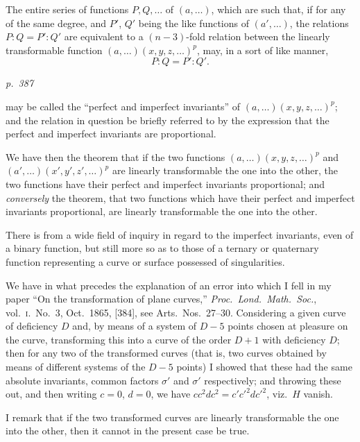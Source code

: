 \documentclass[11pt,a4paper]{book}
\begin{document}
The entire series of functions $P, Q, \ldots$ of $(a, \ldots)$, which are such that, if  for
any of the same degree, and $P'$, $Q'$ being the like functions of $(a', \ldots)$, the relations
$P : Q = P' : Q'$ are equivalent to a $(n-3)$-fold relation between the
linearly transformable function $(a, \ldots)(x, y, z, \ldots)^p$, may, in a sort of like manner,
\[
P : Q = P' : Q'.
\]

\clearpage

\bigskip
\textit{p.~387}
\smallskip

\noindent
may be called the ``perfect and imperfect invariants'' of $(a, \ldots)(x, y, z, \ldots)^p$; and the
relation in question be briefly referred to by the expression that the perfect and
imperfect invariants are proportional.

We have then the theorem that if the two functions $(a, \ldots)(x, y, z, \ldots)^p$ and
$(a', \ldots)(x', y', z', \ldots)^p$ are linearly transformable the one into the other, the two functions
have their perfect and imperfect invariants proportional; and \textit{conversely} the theorem,
that two functions which have their perfect and imperfect invariants proportional, are
linearly transformable the one into the other.

There is from a wide field of inquiry in regard to the imperfect invariants, even
of a binary function, but still more so as to those of a ternary or quaternary function
representing a curve or surface possessed of singularities.

We have in what precedes the explanation of an error into which I fell in my
paper ``On the transformation of plane curves,'' \textit{Proc.\ Lond.\ Math.\ Soc.}, vol.\ \textsc{i}.\ No.~3,
Oct.\ 1865, [384], see Arts.\ Nos.\ 27--30.  Considering a given curve of deficiency $D$ and,
by means of a system of $D - 5$ points chosen at pleasure on the curve, transforming this
into a curve of the order $D + 1$ with deficiency $D$; then for any two of the transformed
curves (that is, two curves obtained by means of different systems of the $D - 5$ points)
I showed that these had the same absolute invariants, common factors $\sigma'$ and $\sigma'$ respectively;
and throwing these out, and then writing $c = 0$, $d = 0$, we have $c c^2 d c^2 = c'c'^2 d c'^2$, viz.\ $H$ vanish.

I remark that if the two transformed curves are linearly transformable the one
into the other, then it cannot in the present case be true.
\end{document}
